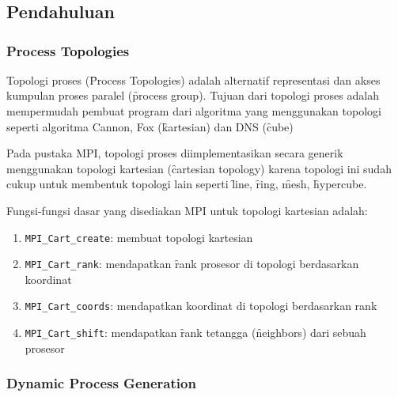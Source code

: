 \chapter{\topikDua}

\section{Pendahuluan}

\subsection{Process Topologies}

Topologi proses (\f{Process Topologies}) adalah alternatif representasi dan akses kumpulan proses paralel (\f{process group}). Tujuan dari topologi proses adalah mempermudah pembuat program dari algoritma yang menggunakan topologi seperti algoritma Cannon, Fox (\f{kartesian}) dan DNS (\f{cube})

Pada pustaka MPI, topologi proses diimplementasikan secara generik menggunakan topologi kartesian (\f{cartesian topology}) karena topologi ini sudah cukup untuk membentuk topologi lain seperti \f{line}, \f{ring}, \f{mesh}, \f{hypercube}.

Fungsi-fungsi dasar yang disediakan MPI untuk topologi kartesian adalah:
\begin{enumerate}
	\item \verb|MPI_Cart_create|: membuat topologi kartesian
	\item \verb|MPI_Cart_rank|: mendapatkan \f{rank} prosesor di topologi berdasarkan koordinat
	\item \verb|MPI_Cart_coords|: mendapatkan koordinat di topologi berdasarkan  rank
	\item \verb|MPI_Cart_shift|: mendapatkan \f{rank} tetangga (\f{neighbors}) dari sebuah prosesor
\end{enumerate}

\subsection{Dynamic Process Generation}


